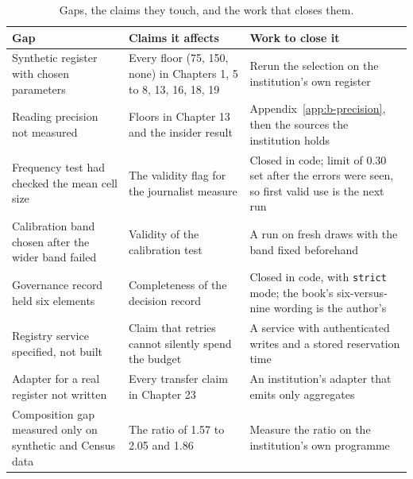 \begin{table}[t]
\centering
\caption{Gaps, the claims they touch, and the work that closes them.}\label{app:tab-gaps}
\small
\setlength{\tabcolsep}{3pt}
\begin{tabular}{@{}>{\raggedright\arraybackslash}p{3.0cm}>{\raggedright\arraybackslash}p{4.4cm}>{\raggedright\arraybackslash}p{4.6cm}@{}}
\toprule
Gap & Claims it affects & Work to close it \\
\midrule
Synthetic register with chosen parameters & Every floor (75, 150, none) in Chapters 1, 5 to 8,
13, 16, 18, 19 & Rerun the selection on the institution's own register \\
\addlinespace
Reading precision not measured & Floors in Chapter 13 and the insider result &
Appendix~\ref{app:b-precision}, then the sources the institution holds \\
\addlinespace
Frequency test had checked the mean cell size & The validity flag for the journalist measure &
Closed in code; limit of 0.30 set after the errors were seen, so first valid use is the next run \\
\addlinespace
Calibration band chosen after the wider band failed & Validity of the calibration test &
A run on fresh draws with the band fixed beforehand \\
\addlinespace
Governance record held six elements & Completeness of the decision record &
Closed in code, with \texttt{strict} mode; the book's six-versus-nine wording is the author's \\
\addlinespace
Registry service specified, not built & Claim that retries cannot silently spend the budget &
A service with authenticated writes and a stored reservation time \\
\addlinespace
Adapter for a real register not written & Every transfer claim in Chapter 23 &
An institution's adapter that emits only aggregates \\
\addlinespace
Composition gap measured only on synthetic and Census data & The ratio of 1.57 to 2.05 and 1.86 &
Measure the ratio on the institution's own programme \\
\bottomrule
\end{tabular}
\end{table}

